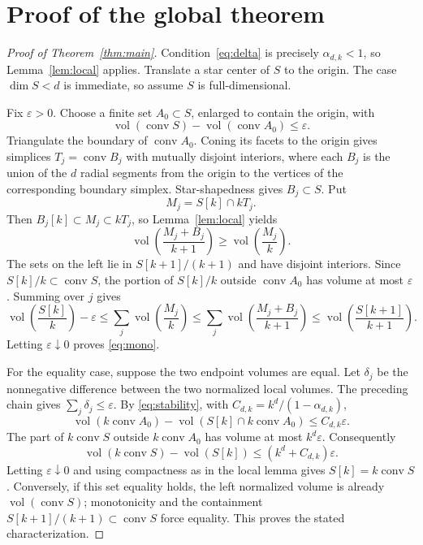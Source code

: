 \documentclass[11pt]{article}
\newcommand{\vol}{\operatorname{vol}}
\newcommand{\conv}{\operatorname{conv}}
\begin{document}
\section{Proof of the global theorem}

\begin{proof}[Proof of Theorem~\ref{thm:main}]
Condition~\eqref{eq:delta} is precisely $\alpha_{d,k}<1$, so
Lemma~\ref{lem:local} applies.  Translate a star center of $S$ to the origin.
The case $\dim S<d$ is immediate, so assume $S$ is full-dimensional.

Fix $\varepsilon>0$.  Choose a finite set $A_0\subset S$, enlarged to contain
the origin, with
\[
 \vol(\conv S)-\vol(\conv A_0)\le\varepsilon.
\]
Triangulate the boundary of $\conv A_0$.  Coning its facets to the origin
gives simplices $T_j=\conv B_j$ with mutually disjoint interiors, where each
$B_j$ is the union of the $d$ radial segments from the origin to the vertices
of the corresponding boundary simplex.  Star-shapedness gives $B_j\subset S$.
Put
\[
                         M_j=S[k]\cap kT_j.
\]
Then $B_j[k]\subset M_j\subset kT_j$, so Lemma~\ref{lem:local} yields
\[
 \vol\!\left(\frac{M_j+B_j}{k+1}\right)
 \ge \vol\!\left(\frac{M_j}{k}\right).
\]
The sets on the left lie in $S[k+1]/(k+1)$ and have disjoint interiors.
Since $S[k]/k\subset\conv S$, the portion of $S[k]/k$ outside
$\conv A_0$ has volume at most $\varepsilon$.  Summing over $j$ gives
\[
 \vol\!\left(\frac{S[k]}{k}\right)-\varepsilon
 \le\sum_j\vol\!\left(\frac{M_j}{k}\right)
 \le\sum_j\vol\!\left(\frac{M_j+B_j}{k+1}\right)
 \le\vol\!\left(\frac{S[k+1]}{k+1}\right).
\]
Letting $\varepsilon\downarrow0$ proves \eqref{eq:mono}.

For the equality case, suppose the two endpoint volumes are equal.  Let
$\delta_j$ be the nonnegative difference between the two normalized local
volumes.  The preceding chain gives $\sum_j\delta_j\le\varepsilon$.
By \eqref{eq:stability}, with
$C_{d,k}=k^d/(1-\alpha_{d,k})$,
\[
 \vol(k\conv A_0)-\vol(S[k]\cap k\conv A_0)
 \le C_{d,k}\varepsilon.
\]
The part of $k\conv S$ outside $k\conv A_0$ has volume at most
$k^d\varepsilon$.  Consequently
\[
       \vol(k\conv S)-\vol(S[k])
       \le (k^d+C_{d,k})\varepsilon.
\]
Letting $\varepsilon\downarrow0$ and using compactness as in the local lemma
gives $S[k]=k\conv S$.  Conversely, if this set equality holds, the left
normalized volume is already $\vol(\conv S)$; monotonicity and the containment
$S[k+1]/(k+1)\subset\conv S$ force equality.  This proves the stated
characterization.
\end{proof}
\end{document}
